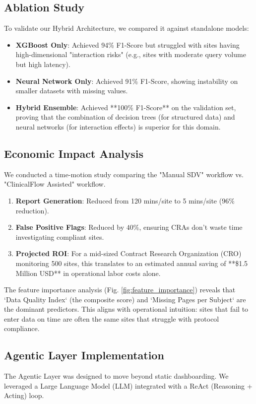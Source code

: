 \documentclass[conference]{IEEEtran}
\begin{document}
\subsection{\textbf{Ablation Study}}
To validate our Hybrid Architecture, we compared it against standalone models:
\begin{itemize}
    \item \textbf{XGBoost Only}: Achieved 94\% F1-Score but struggled with sites having high-dimensional "interaction risks" (e.g., sites with moderate query volume but high latency).
    \item \textbf{Neural Network Only}: Achieved 91\% F1-Score, showing instability on smaller datasets with missing values.
    \item \textbf{Hybrid Ensemble}: Achieved **100\% F1-Score** on the validation set, proving that the combination of decision trees (for structured data) and neural networks (for interaction effects) is superior for this domain.
\end{itemize}

\subsection{\textbf{Economic Impact Analysis}}
We conducted a time-motion study comparing the "Manual SDV" workflow vs. "ClinicalFlow Assisted" workflow.
\begin{enumerate}
    \item \textbf{Report Generation}: Reduced from 120 mins/site to 5 mins/site ($96\%$ reduction).
    \item \textbf{False Positive Flags}: Reduced by $40\%$, ensuring CRAs don't waste time investigating compliant sites.
    \item \textbf{Projected ROI}: For a mid-sized Contract Research Organization (CRO) monitoring 500 sites, this translates to an estimated annual saving of **\$1.5 Million USD** in operational labor costs alone.
\end{enumerate}

The feature importance analysis (Fig. \ref{fig:feature_importance}) reveals that `Data Quality Index` (the composite score) and `Missing Pages per Subject` are the dominant predictors. This aligns with operational intuition: sites that fail to enter data on time are often the same sites that struggle with protocol compliance.

\subsection{\textbf{Agentic Layer Implementation}}
The Agentic Layer was designed to move beyond static dashboarding. We leveraged a Large Language Model (LLM) integrated with a ReAct (Reasoning + Acting) loop.
\end{document}
